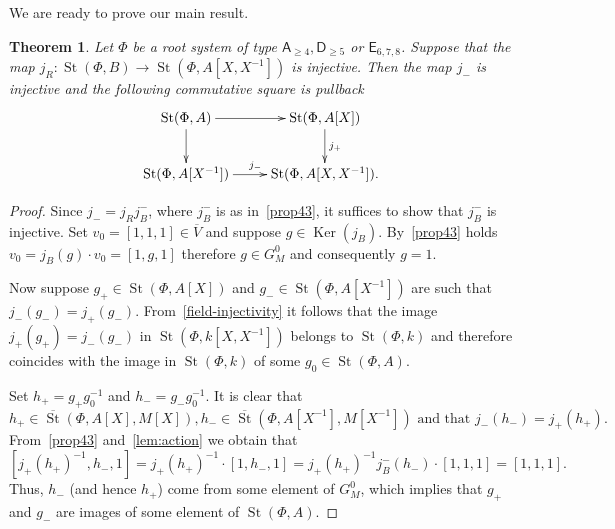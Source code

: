 \documentclass[oneside, 8pt]{amsart}
\newtheorem{theorem}{Theorem}
\theoremstyle{remark}
\theoremstyle{definition}
\numberwithin{lemma}{section}
\numberwithin{prop}{section}
\numberwithin{corollary}{section}
\numberwithin{externaltheorem}{section}
\DeclareMathOperator{\Ker}{Ker}
\DeclareMathOperator{\St}{St}
\newcommand{\inv}{^{-1}}
\newcommand{\rA}{\mathsf{A}}
\newcommand{\rD}{\mathsf{D}}
\newcommand{\rE}{\mathsf{E}}
\numberwithin{equation}{section}
\begin{document}
We are ready to prove our main result.
\begin{theorem} \label{thm:P1glueing}
 Let $\Phi$ be a root system of type $\rA_{\geq 4}, \rD_{\geq 5}$ or $\rE_{6,7,8}$.
 Suppose that the map $j_R \colon \St(\Phi, B) \to \St(\Phi, A[X, X\inv])$ is injective.  
 Then the map $j_-$ is injective and the following commutative square is pullback
 \begin{equation} \nonumber
  \xymatrix{ \St(\Phi, A) \ar[r] \ar[d] & \St(\Phi, A[X]) \ar[d]^{j_+} \\ \St(\Phi, A[X\inv]) \ar[r]^{j_-} & \St(\Phi, A[X, X\inv]).}
 \end{equation}
\end{theorem}
\begin{proof} Since $j_- = j_R j_B^-$, where $j_B^-$ is as in~\cref{prop43}, it suffices to show that $j_B^-$ is injective.
 Set $v_0 = [1, 1, 1] \in \overline{V}$ and suppose $g \in \Ker(j_B)$.
 By~\cref{prop43} holds $v_0 = j_B(g) \cdot v_0 = [1, g, 1]$ therefore $g \in G_M^0$ and consequently $g = 1$.
 
 Now suppose $g_+ \in \St(\Phi, A[X])$ and $g_- \in \St(\Phi, A[X\inv])$ are such that $j_-(g_-) = j_+(g_-)$.
 From~\cref{field-injectivity} it follows that the image $j_+(g_+) = j_-(g_-)$ in $\St(\Phi, k[X, X\inv])$ belongs to $\St(\Phi, k)$ and therefore coincides with the image in $\St(\Phi, k)$ of some $g_0 \in \St(\Phi, A)$.
 
 Set $h_+ = g_+g_0^{-1}$ and $h_- = g_-g_0^{-1}$.
 It is clear that \[ h_+ \in \overline{\St}(\Phi, A[X], M[X]), h_- \in \overline{\St}(\Phi, A[X\inv], M[X\inv])\text{ and that }j_-(h_-) = j_+(h_+).\]
 From~\cref{prop43} and~\cref{lem:action} we obtain that
 \[ [j_+(h_+)^{-1}, h_-, 1] = j_+(h_+)^{-1} \cdot [1, h_-, 1] = j_+(h_+)^{-1} j_B^-(h_-) \cdot [1, 1, 1] = [1, 1, 1]. \]
 Thus, $h_-$ (and hence $h_+$) come from some element of $G_M^0$, which implies that $g_+$ and $g_-$ are images of some element of $\St(\Phi, A)$.
 \end{proof}

\printbibliography
\end{document}
